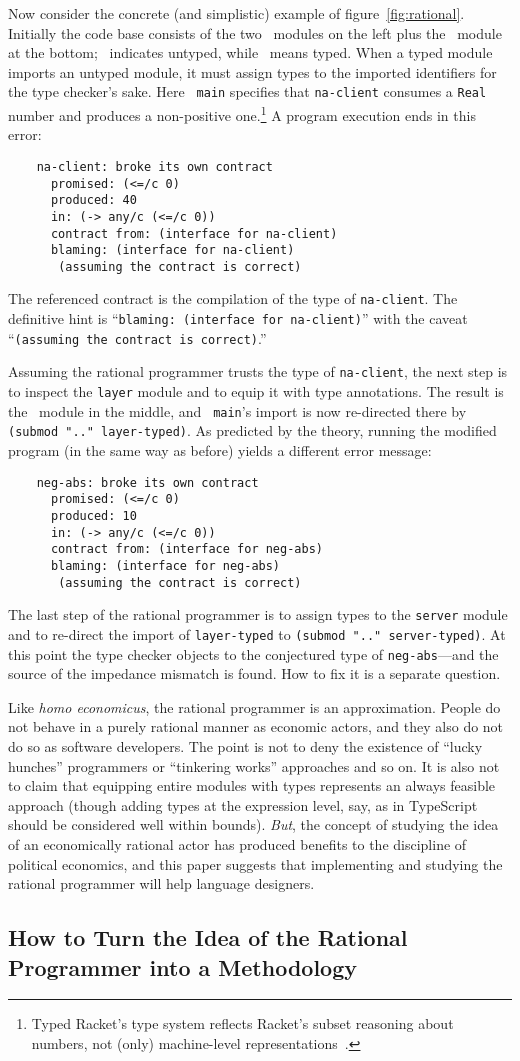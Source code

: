 Now consider the concrete (and simplistic) example of figure~\ref{fig:rational}.
Initially the code base consists of the two \dyncolor\ modules on the left plus
the \typecolor\ module at the bottom; \dyncolor\ indicates untyped, while
\typecolor\ means typed. When a typed module imports an untyped module, it must
assign types to the imported identifiers for the type checker's sake. Here {\tt
main} specifies that {\tt na-client} consumes a {\tt Real} number and produces a
non-positive one.\footnote{Typed Racket's type system reflects Racket's subset
reasoning about numbers, not (only) machine-level
representations~\citep{stathff-padl-12}.} A program execution ends in this error:
\begin{verbatim}
    na-client: broke its own contract
      promised: (<=/c 0)
      produced: 40
      in: (-> any/c (<=/c 0))           
      contract from: (interface for na-client)
      blaming: (interface for na-client)
       (assuming the contract is correct)
\end{verbatim}
The referenced contract is the compilation of the type of {\tt na-client}. The
definitive hint is ``{\tt blaming: (interface for na-client)}'' with the caveat
``{\tt (assuming the contract is correct)}.''

Assuming the rational programmer trusts the type of {\tt na-client}, the next
step is to inspect the {\tt layer} module and to equip it with type
annotations. The result is the \typecolor\ module in the middle, and {\tt
main}'s import is now re-directed there by {\tt (submod ".." layer-typed)}. As
predicted by the theory, running the modified program (in the same way as before) yields a different error message:
\begin{verbatim}
    neg-abs: broke its own contract
      promised: (<=/c 0)
      produced: 10
      in: (-> any/c (<=/c 0))
      contract from: (interface for neg-abs)
      blaming: (interface for neg-abs)
       (assuming the contract is correct)
\end{verbatim}
The last step of the rational programmer is to assign types to the {\tt server}
module and to re-direct the import of {\tt layer-typed} to {\tt (submod ".."
server-typed)}. At this point the type checker objects to the conjectured type
of {\tt neg-abs}---and the source of the impedance mismatch is found. How to fix
it is a separate question.

Like {\it homo economicus\/}, the rational programmer is an approximation.
People do not behave in a purely rational manner as economic actors, and they
also do not do so as software developers. The point is not to deny the existence
of ``lucky hunches'' programmers or ``tinkering works'' approaches and so on. It
is also not to claim that equipping entire modules with types represents an
always feasible approach (though adding types at the expression level, say, as
in TypeScript should be considered well within bounds).  {\em But\/}, the
concept of studying the idea of an economically rational actor has produced
benefits to the discipline of political economics, and this paper suggests that
implementing and studying the rational programmer will help language designers.

\subsection{How to Turn the Idea of the Rational Programmer into a Methodology} 
\label{sub:methodology}


